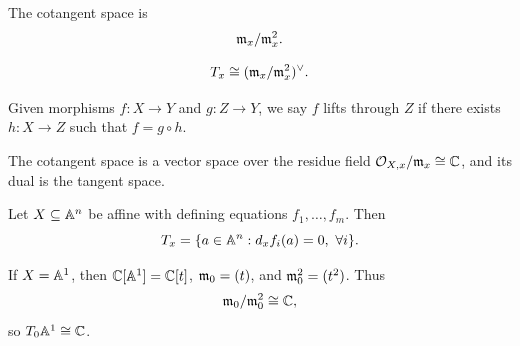 \begin{definition}
    The cotangent space is
    \[
        \m_x / \m_x^2.
    \]
\end{definition}

\begin{theorem*}{
    \[
        T_x \cong (\m_x / \m_x^2)^\vee.
    \]
}
\end{theorem*}

\begin{definition}[Lift]
    Given morphisms $f : X \to Y$ and $g : Z \to Y$, we say $f$ lifts through $Z$ if there exists $h : X \to Z$ such that $f = g \circ h$.
\end{definition}

\begin{remark}
    The cotangent space is a vector space over the residue field $\o_{X,x}/\m_x \cong \c$, and its dual is the tangent space.
\end{remark}

\begin{proposition*}{
    Let $X \subseteq \aa^n$ be affine with defining equations $f_1,\ldots,f_m$.
    Then
    \[
        T_x = \{ a \in \aa^n : d_x f_i(a) = 0,\ \forall i \}.
    \]
}
\end{proposition*}

\begin{example}
    If $X = \aa^1$, then $\c[\aa^1] = \c[t]$, $\m_0 = (t)$, and $\m_0^2 = (t^2)$.
    Thus
    \[
        \m_0 / \m_0^2 \cong \c,
    \]
    so $T_0 \aa^1 \cong \c$.
\end{example}
